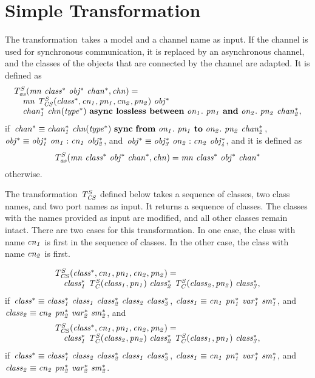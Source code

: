 \section{Simple Transformation}
\label{sec:transformations-slco:simple}
The transformation~\TSim takes a model and a channel name as input.
If the channel is used for synchronous communication, it is replaced by an asynchronous channel, and the classes of the objects that are connected by the channel are adapted.
It is defined as
%
\[
\begin{array}{l}
T^S_{\it{as}}(\it{mn}~\it{class^*}~\it{obj^*}~\it{chan^*}, \it{chn}) = \\
\quad \it{mn} ~
T^S_{\it{CS}}(\it{class^*}, \it{cn_1}, \it{pn_1}, \it{cn_2}, \it{pn_2}) ~
\it{obj^*} \\
\quad \it{chan_1^*}~\it{chn}(\it{type^*})~\textbf{async lossless between}~\it{on_1}.~\it{pn_1}~\textbf{and}~\it{on_2}.~\it{pn_2}~\it{chan_2^*},
\end{array}
\]
if~$\it{chan^*} \equiv \it{chan_1^*}~\it{chn}(\it{type^*})~\textbf{sync}~\textbf{from}~\it{on_1}.~\it{pn_1}~\textbf{to}~\it{on_2}.~\it{pn_2}~\it{chan_2^*}$, $\it{obj^*} \equiv \it{obj_1^*}~\it{on_1}:\it{cn_1}~\it{obj_2^*}$,
and~$\it{obj^*} \equiv \it{obj_3^*}~\it{on_2}:\it{cn_2}~\it{obj_4^*}$,
and it is defined as
\[
T^S_{\it{as}}(\it{mn}~\it{class^*}~\it{obj^*}~\it{chan^*}, \it{chn}) = \it{mn}~\it{class^*}~\it{obj^*}~\it{chan^*}
\]
otherwise.

The transformation~$T^S_{\it{CS}}$ defined below takes a sequence of classes, two class names, and two port names as input.
It returns a sequence of classes.
The classes with the names provided as input are modified, and all other classes remain intact.
There are two cases for this transformation.
In one case, the class with name $\it{cn_1}$ is first in the sequence of classes.
In the other case, the class with name $\it{cn_2}$ is first.

\[
\begin{array}{l}
T^S_{\it{CS}}(\it{class^*}, \it{cn_1}, \it{pn_1}, \it{cn_2}, \it{pn_2}) =\\
\quad \it{class_1^*}~T^S_{\it{C}}(\it{class_1}, \it{pn_1})~\it{class_2^*}~T^S_{\it{C}}(\it{class_2}, \it{pn_2})~\it{class_3^*},
\end{array}
\]
if~$\it{class^*} \equiv \it{class_1^*}~\it{class_1}~\it{class_2^*}~\it{class_2}~\it{class_3^*}$, $\it{class_1} \equiv \it{cn_1}~\it{pn_1^*}~\it{var_1^*}~\it{sm_1^*}$, and $\it{class_2} \equiv \it{cn_2}~\it{pn_2^*}~\it{var_2^*}~\it{sm_2^*}$, and
\[
\begin{array}{l}
T^S_{\it{CS}}(\it{class^*}, \it{cn_1}, \it{pn_1}, \it{cn_2}, \it{pn_2}) = \\
\quad \it{class_1^*}~T^S_{\it{C}}(\it{class_2}, \it{pn_2})~\it{class_2^*}~T^S_{\it{C}}(\it{class_1}, \it{pn_1})~\it{class_3^*},
\end{array}
\]
if~$\it{class^*} \equiv \it{class_1^*}~\it{class_2}~\it{class_2^*}~\it{class_1}~\it{class_3^*}$, $\it{class_1} \equiv \it{cn_1}~\it{pn_1^*}~\it{var_1^*}~\it{sm_1^*}$, and~$\it{class_2} \equiv \it{cn_2}~\it{pn_2^*}~\it{var_2^*}~\it{sm_2^*}$.


